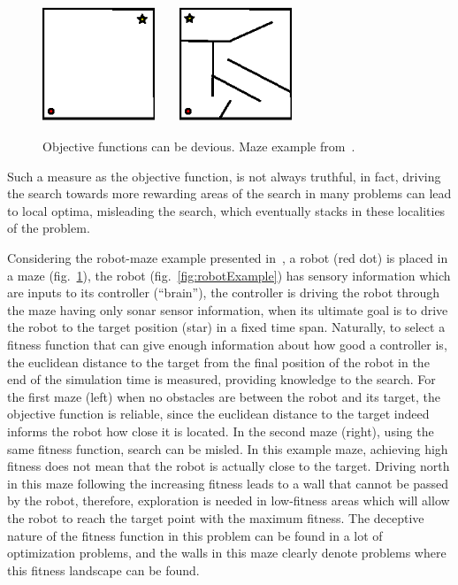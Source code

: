 \begin{figure}
\centering
\includegraphics[width=0.3\textwidth]{../Figures/Misc/mazeEasy.eps}\  \ \   \   
\includegraphics[width=0.3\textwidth]{../Figures/Misc/maze.eps}
\caption{Objective functions can be devious. Maze example from~\cite{lehman2011abandoning}.}
\label{fig:maze}
\end{figure}

Such a measure as the objective function, is not always truthful, in fact, driving the search towards more rewarding areas of the search in many problems can lead to local optima, misleading the search, which eventually stacks in these localities of the problem. 

Considering the robot-maze example presented in~\cite{lehman2011abandoning,lehman2010revising}, a robot (red dot) is placed in a maze (fig.~\ref{fig:maze}), the robot (fig.~\ref{fig:robotExample}) has sensory information which are inputs to its controller (``brain''), the controller is driving the robot through the maze having only sonar sensor information, when its ultimate goal is to drive the robot to the target position (star) in a fixed time span. Naturally, to select a fitness function that can give enough information about how good a controller is, the euclidean distance to the target from the final position of the robot in the end of the simulation time is measured, providing knowledge to the search. For the first maze (left) when no obstacles are between the robot and its target, the objective function is reliable, since the euclidean distance to the target indeed informs the robot how close it is located. In the second maze (right), using the same fitness function, search can be misled. In this example maze, achieving high fitness does not mean that the robot is actually close to the target. Driving north in this maze following the increasing fitness leads to a wall that cannot be passed by the robot, therefore, exploration is needed in low-fitness areas which will allow the robot to reach the target point with the maximum fitness. The deceptive nature of the fitness function in this problem can be found in a lot of optimization problems, and the walls in this maze clearly denote problems where this fitness landscape can be found.

